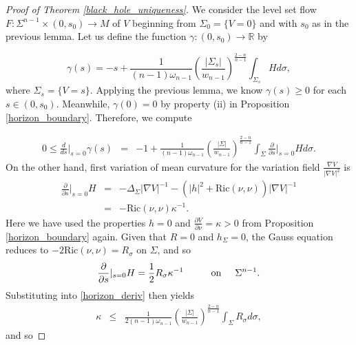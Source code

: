\documentclass[12pt,twoside]{article}
\theoremstyle{plain}
\theoremstyle{definition}
\theoremstyle{remark}
\numberwithin{equation}{section}
\begin{document}
\begin{proof}[Proof of Theorem \ref{black_hole_uniqueness}]
We consider the level set flow $F: \Sigma^{n-1} \times (0, s_{0}) \rightarrow M$ of $V$ beginning from $\Sigma_{0} = \{ V=0 \}$ and with $s_{0}$ as in the previous lemma. Let us define the function $\gamma: (0,s_{0}) \rightarrow \mathbb{R}$ by

\begin{equation}
    \gamma(s)= - s + \frac{1}{(n-1)\omega_{n-1}} \left( \frac{|\Sigma_{s}|}{w_{n-1}} \right)^{\frac{2-n}{n-1}} \int_{\Sigma_{s} } H d \sigma,
\end{equation}
where $\Sigma_{s}= \{ V=s \}$. Applying the previous lemma, we know $\gamma(s) \geq 0$ for each $s \in (0,s_{0})$. Meanwhile, $\gamma(0)=0$ by property (ii) in Proposition \ref{horizon_boundary}. Therefore, we compute

\begin{eqnarray} \label{horizon_deriv}
    0 \leq \frac{d}{ds}|_{s =0 } \gamma(s) 
   &=& -1 + \frac{1}{(n-1)\omega_{n-1}} \left(\frac{|\Sigma|}{w_{n-1}} \right)^{\frac{2-n}{n-1}} \int_{\Sigma} \frac{\partial}{\partial s}\rvert_{s=0} H d\sigma. \nonumber
\end{eqnarray}
On the other hand, first variation of mean curvature for the variation field $\frac{\nabla V}{|\nabla V|^{2}}$ is
\begin{eqnarray*}
    \frac{\partial}{\partial s}\vert_{s =0} H &=& - \Delta_{\Sigma} |\nabla V|^{-1} - (|h|^{2} + \text{Ric}(\nu,\nu)) |\nabla V|^{-1} \\
    &=& -\text{Ric}(\nu,\nu) \kappa^{-1}. \nonumber
\end{eqnarray*}
Here we have used the properties $h=0$ and $\frac{\partial V}{\partial \nu} = \kappa >0$ from Proposition \ref{horizon_boundary} again. Given that $R =0$ and $h_{\Sigma}=0$, the Gauss equation reduces to $-2\text{Ric}(\nu,\nu)= R_{\sigma} $ on $\Sigma$, and so
\begin{equation*}
    \frac{\partial}{\partial s} \vert_{s=0} H= \frac{1}{2} R_{\sigma} \kappa^{-1} \hspace{1cm} \text{on} \hspace{0.5cm} \Sigma^{n-1}.
\end{equation*}
Substituting into \eqref{horizon_deriv} then yields
\begin{eqnarray*}
    \kappa &\leq&  \frac{1}{2(n-1)\omega_{n-1}} \left(\frac{|\Sigma|}{w_{n-1}} \right)^{\frac{2-n}{n-1}} \int_{\Sigma} R_{\sigma} d\sigma,
\end{eqnarray*}
and so


\end{proof}
\end{document}
